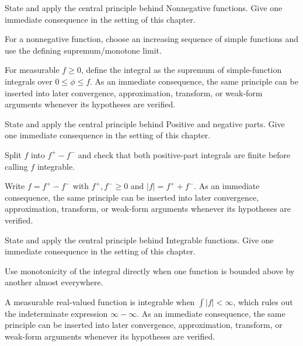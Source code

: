 \begin{exercise}\label{exr:iii03-02}
State and apply the central principle behind Nonnegative functions. Give one immediate consequence in the setting of this chapter.
\end{exercise}
\begin{hint}
For a nonnegative function, choose an increasing sequence of simple functions and use the defining supremum/monotone limit.
\end{hint}
\begin{solution}
For measurable $f\ge0$, define the integral as the supremum of simple-function integrals over $0\le\phi\le f$. As an immediate consequence, the same principle can be inserted into later convergence, approximation, transform, or weak-form arguments whenever its hypotheses are verified.
\end{solution}

\begin{exercise}\label{exr:iii03-03}
State and apply the central principle behind Positive and negative parts. Give one immediate consequence in the setting of this chapter.
\end{exercise}
\begin{hint}
Split \(f\) into \(f^+-f^-\) and check that both positive-part integrals are finite before calling \(f\) integrable.
\end{hint}
\begin{solution}
Write $f=f^+-f^-$ with $f^+,f^-\ge0$ and $|f|=f^++f^-$. As an immediate consequence, the same principle can be inserted into later convergence, approximation, transform, or weak-form arguments whenever its hypotheses are verified.
\end{solution}

\begin{exercise}\label{exr:iii03-04}
State and apply the central principle behind Integrable functions. Give one immediate consequence in the setting of this chapter.
\end{exercise}
\begin{hint}
Use monotonicity of the integral directly when one function is bounded above by another almost everywhere.
\end{hint}
\begin{solution}
A measurable real-valued function is integrable when $\int|f|<\infty$, which rules out the indeterminate expression $\infty-\infty$. As an immediate consequence, the same principle can be inserted into later convergence, approximation, transform, or weak-form arguments whenever its hypotheses are verified.
\end{solution}

